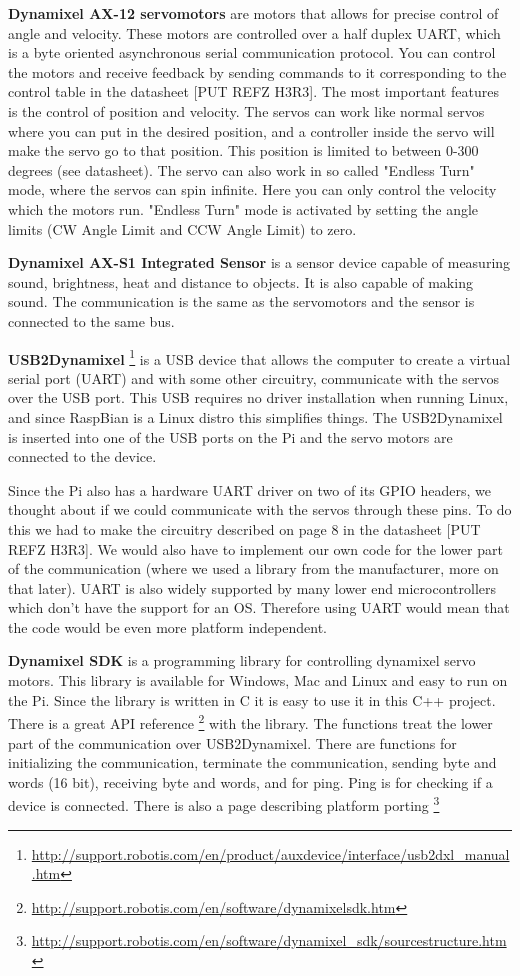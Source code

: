 \textbf{Dynamixel AX-12 servomotors}
are motors that allows for precise control of angle and velocity. These motors are controlled over a half duplex UART, which is a byte oriented asynchronous serial communication protocol. You can control the motors and receive feedback by sending commands to it corresponding to the control table in the datasheet [PUT REFZ H3R3]. The most important features is the control of position and velocity. The servos can work like normal servos where you can put in the desired position, and a controller inside the servo will make the servo go to that position. This position is limited to between 0-300 degrees (see datasheet). The servo can also work in so called "Endless Turn" mode, where the servos can spin infinite. Here you can only control the velocity which the motors run. "Endless Turn" mode is activated by setting the angle limits (CW Angle Limit and CCW Angle Limit) to zero.
\bigskip

\textbf{Dynamixel AX-S1 Integrated Sensor}
is a sensor device capable of measuring sound, brightness, heat and distance to objects. It is also capable of making sound. The communication is the same as the servomotors and the sensor is connected to the same bus. 
\bigskip

\textbf{USB2Dynamixel} \footnote{\url{http://support.robotis.com/en/product/auxdevice/interface/usb2dxl_manual.htm}} is a USB device that allows the computer to create a virtual serial port (UART) and with some other circuitry, communicate with the servos over the USB port.
This USB requires no driver installation when running Linux, and since RaspBian is a Linux distro this simplifies things. 
The USB2Dynamixel is inserted into one of the USB ports on the Pi and the servo motors are connected to the device.

Since the Pi also has a hardware UART driver on two of its GPIO headers, we thought about if we could communicate with the servos through these pins. 
To do this we had to make the circuitry described on page 8 in the datasheet [PUT REFZ H3R3]. 
We would also have to implement our own code for the lower part of the communication (where we used a library from the manufacturer, more on that later).
UART is also widely supported by many lower end microcontrollers which don't have the support for an OS. 
Therefore using UART would mean that the code would be even more platform independent.
\bigskip

\textbf{Dynamixel SDK} is a programming library for controlling dynamixel servo motors. 
This library is available for Windows, Mac and Linux and easy to run on the Pi. 
Since the library is written in C it is easy to use it in this C++ project.
There is a great API reference \footnote{\url{http://support.robotis.com/en/software/dynamixelsdk.htm}} with the library.
The functions treat the lower part of the communication over USB2Dynamixel.
There are functions for initializing the communication, terminate the communication, sending byte and words (16 bit), receiving byte and words, and for ping. Ping is for checking if a device is connected.
There is also a page describing platform porting \footnote{\url{http://support.robotis.com/en/software/dynamixel_sdk/sourcestructure.htm}}


